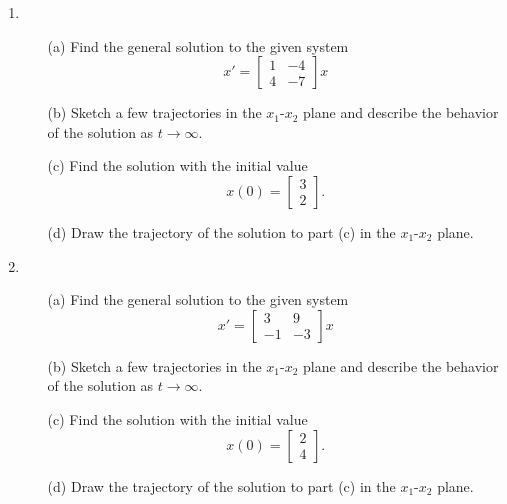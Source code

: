 \documentclass[11pt]{article}
\theoremstyle{definition}
\begin{document}
\begin{enumerate}[leftmargin=*]
\item
\begin{itemize}
\item[(a)] Find the general solution to the given system 
\[
x'=\left[
\begin{array}{cc}
1 & -4\\
4 & -7 
\end{array}\right]x
\]
\item[(b)] Sketch a few trajectories in the $x_1$-$x_2$ plane and describe the behavior of the solution as $t\to \infty$.
\item[(c)]  Find the solution with the initial value
\[
x(0)=\left[\begin{array}{c}
3 \\
2
\end{array}\right].
\]
\item[(d)] Draw the trajectory of the solution to part (c) in the $x_1$-$x_2$ plane.  \\
\end{itemize}


\item 
\begin{itemize}
\item[(a)] Find the general solution to the given system 
\[
x'=\left[
\begin{array}{cc}
3 & 9\\
-1 & -3 
\end{array}\right] x
\]
\item[(b)] Sketch a few trajectories in the $x_1$-$x_2$ plane and describe the behavior of the solution as $t\to \infty$.
\item[(c)] Find the solution with the initial value
\[
x(0)=\left[\begin{array}{c}
2 \\
4
\end{array}\right].
\]
\item[(d)] Draw the trajectory of the solution to part (c) in the $x_1$-$x_2$ plane.  
\end{itemize}
\end{enumerate}
\end{document}
